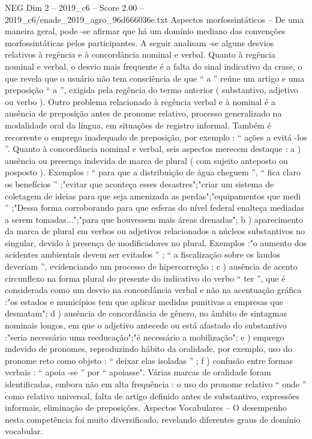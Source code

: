 \begin{textsample}{NEG Dim 2 – 2019\_c6 – Score 2.00 – 2019\_c6/enade\_2019\_agro\_96d666036e.txt}
Aspectos morfossintáticos – De uma maneira geral, pode -se afirmar que há um domínio mediano das convenções morfossintáticas pelos participantes.
A seguir analisam -se alguns desvios relativos à regência e à concordância nominal e verbal.
Quanto à regência nominal e verbal, o desvio mais frequente é a falta do sinal indicativo da crase, o que revela que o usuário não tem consciência de que “ a ” reúne um artigo e uma preposição “ a ”, exigida pela regência do termo anterior ( substantivo, adjetivo ou verbo ).
Outro problema relacionado à regência verbal e à nominal é a ausência de preposição antes de pronome relativo, processo generalizado na modalidade oral da língua, em situações de registro informal.
Também é recorrente o emprego inadequado de preposição, por exemplo : “ ações a evitá -los ”.
Quanto à concordância nominal e verbal, seis aspectos merecem destaque : a ) ausência ou presença indevida de marca de plural ( com sujeito anteposto ou posposto ).
Exemplos : “ para que a distribuição de água cheguem ”, “ fica claro os benefícios ” ;"evitar que aconteça esses desastres";"criar um sistema de coletagem de ideias para que seja amenizada as perdas";"equipamentos que medi ” ;"Dessa forma corroborando para que esferas do nível federal enalteça mediadas a serem tomadas...";"para que houvessem mais áreas drenadas"; b ) aparecimento da marca de plural em verbos ou adjetivos relacionados a núcleos substantivos no singular, devido à presença de modificadores no plural.
Exemplos :"o aumento dos acidentes ambientais devem ser evitados ” ; “ a fiscalização sobre os laudos deveriam ”, evidenciando um processo de hipercorreção ; c ) ausência de acento circunflexo na forma plural do presente do indicativo do verbo “ ter ”, que é considerada como um desvio na concordância verbal e não na acentuação gráfica :"os estados e municípios tem que aplicar medidas punitivas a empresas que desmatam"; d ) ausência de concordância de gênero, no âmbito de sintagmas nominais longos, em que o adjetivo antecede ou está afastado do substantivo :"seria necessário uma reeducação";"é necessário a mobilização"; e ) emprego indevido de pronomes, reproduzindo hábito da oralidade, por exemplo, uso do pronome reto como objeto : “ deixar elas isoladas ” ; f ) confusão entre formas verbais : “ apoia -se ” por “ apoiasse".
Várias marcas de oralidade foram identificadas, embora não em alta frequência : o uso do pronome relativo “ onde ” como relativo universal, falta de artigo definido antes de substantivo, expressões informais, eliminação de preposições.
Aspectos Vocabulares – O desempenho nesta competência foi muito diversificado, revelando diferentes graus de domínio vocabular.

\end{textsample}
